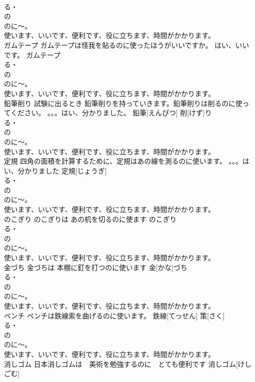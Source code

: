 \documentclass[8pt]{extreport}
\begin{document}
\begin{CJK}{UTF8}{min}
\\	る・
\\	の　
\\	のに～。
\\	使います、いいです、便利です、役に立ちます、時間がかかります。	
\\	ガムテープ	ガムテープは怪我を貼るのに使ったほうがいいですか。 はい、いいです。	ガムテープ				
\\	る・
\\	の　
\\	のに～。
\\	使います、いいです、便利です、役に立ちます、時間がかかります。		
\\	鉛筆削り	試験に出るとき 鉛筆削りを持っていきます。鉛筆削りは削るのに使ってください。 。。。はい、分かりました。	鉛筆[えんぴつ] 削[けず]り			
\\	る・
\\	の　
\\	のに～。
\\	使います、いいです、便利です、役に立ちます、時間がかかります。	
\\	定規	四角の面積を計算するために、定規はあの線を測るのに使います。 。。。はい、分かりました	定規[じょうぎ]			
\\	る・
\\	の　
\\	のに～。
\\	使います、いいです、便利です、役に立ちます、時間がかかります。	
\\	のこぎり	のこぎりは あの机を切るのに使ます	のこぎり			
\\	る・
\\	の　
\\	のに～。
\\	使います、いいです、便利です、役に立ちます、時間がかかります。		
\\	金づち	金づちは 本棚に釘を打つのに使います	金[かな]づち			
\\	る・
\\	の　
\\	のに～。
\\	使います、いいです、便利です、役に立ちます、時間がかかります。	
\\	ペンチ	ペンチは鉄線索を曲げるのに使います。	鉄線[てっせん] 策[さく]				
\\	る・
\\	の　
\\	のに～。
\\	使います、いいです、便利です、役に立ちます、時間がかかります。	
\\	消しゴム	日本消しゴムは　美術を勉強するのに　とても便利です	消しゴム[けしごむ]			

\end{CJK}
\end{document}
